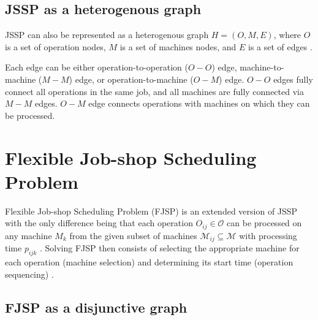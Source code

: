 \subsection{JSSP as a heterogenous graph} \label{JSSP as a heterogenous graph}

JSSP can also be represented as a heterogenous graph $H = (O, M, E)$, where $O$ is a set of operation nodes, $M$ is a set of machines nodes, and $E$ is a set of edges \cite{10226873}.
\par
Each edge can be either operation-to-operation ($O-O$) edge, machine-to-machine ($M-M$) edge, or operation-to-machine ($O-M$) edge. $O-O$ edges fully connect all operations in the same job, and all machines are fully connected via $M-M$ edges. $O-M$ edge connects operations with machines on which they can be processed.

\section{Flexible Job-shop Scheduling Problem}

Flexible Job-shop Scheduling Problem (FJSP) is an extended version of JSSP with the only difference being that each operation $O_{ij} \in \mathcal{O}$ can be processed on any machine $M_k$ from the given subset of machines $\mathcal{M}_{ij} \subseteq \mathcal{M}$ with processing time $p_{ijk}$ \cite{9826438}. Solving FJSP then consists of selecting the appropriate machine for each operation (machine selection) and determining its start time (operation sequencing) \cite{https://doi.org/10.1049/iet-cim.2018.0009}. 

\subsection{FJSP as a disjunctive graph} \label{FJSP as a disjunctive graph}

